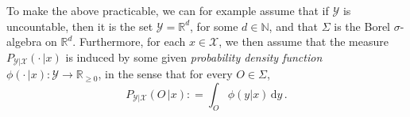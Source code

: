 \documentclass[twoside,11pt]{article}
\newcommand{\nats}{\mathbb{N}}
\newcommand{\reals}{\mathbb{R}}
\newcommand{\realsnonneg}{\reals_{\geq 0}}
\newcommand{\states}{\mathcal{X}}
\newcommand{\observs}{\mathcal{Y}}
\newcommand{\coloneqq}{:\!=}
\begin{document}
To make the above practicable, we can for example assume that if $\observs$ is uncountable, then it is the set $\observs=\reals^d$, for some $d\in\nats$, and that $\Sigma$ is the Borel $\sigma$-algebra on $\reals^d$. 
Furthermore, for each $x\in\states$, we then assume that the measure $P_{\observs\vert\states}(\cdot\,\vert x)$ is induced by some given \emph{probability density function} $\phi(\cdot\,\vert x):\observs\to\realsnonneg$, in the sense that for every $O\in\Sigma$,
\begin{equation*}
P_{\observs\vert\states}(O\,\vert x) \coloneqq \int_O \phi(y\vert x)\,\mathrm{d}y\,.
\end{equation*}
\end{document}
